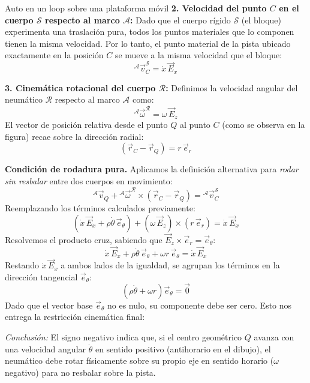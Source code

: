 \begin{solucion}{Auto en un loop sobre una plataforma móvil}
\textbf{2. Velocidad del punto $C$ en el cuerpo $\mathcal{S}$ respecto al marco $\mathcal{A}$:}
Dado que el cuerpo rígido $\mathcal{S}$ (el bloque) experimenta una traslación pura, todos los puntos materiales que lo componen tienen la misma velocidad. Por lo tanto, el punto material de la pista ubicado exactamente en la posición $C$ se mueve a la misma velocidad que el bloque:
\begin{equation*}
    {}^{\mathcal{A}}\vec{v}_C^{\mathcal{S}} = \dot{x}\,\vec{E}_x
\end{equation*}

\textbf{3. Cinemática rotacional del cuerpo $\mathcal{R}$:}
Definimos la velocidad angular del neumático $\mathcal{R}$ respecto al marco $\mathcal{A}$ como:
\begin{equation*}
    {}^{\mathcal{A}}\vec{\omega}^{\mathcal{R}} = \omega\,\vec{E}_z
\end{equation*}
El vector de posición relativa desde el punto $Q$ al punto $C$ (como se observa en la figura) recae sobre la dirección radial:
\begin{equation*}
    (\vec{r}_C - \vec{r}_Q) = r\,\vec{e}_r
\end{equation*}

\textbf{Condición de rodadura pura.}
Aplicamos la definición alternativa para \emph{rodar sin resbalar} entre dos cuerpos en movimiento:
\begin{equation*}
    {}^{\mathcal{A}}\vec{v}_Q + {}^{\mathcal{A}}\vec{\omega}^{\mathcal{R}} \times (\vec{r}_C - \vec{r}_Q) = {}^{\mathcal{A}}\vec{v}_C^{\mathcal{S}}
\end{equation*}
Reemplazando los términos calculados previamente:
\begin{equation*}
    (\dot{x}\,\vec{E}_x + \rho\dot{\theta}\,\vec{e}_\theta) + (\omega\,\vec{E}_z) \times (r\,\vec{e}_r) = \dot{x}\,\vec{E}_x
\end{equation*}
Resolvemos el producto cruz, sabiendo que $\vec{E}_z \times \vec{e}_r = \vec{e}_\theta$:
\begin{equation*}
    \dot{x}\,\vec{E}_x + \rho\dot{\theta}\,\vec{e}_\theta + \omega r\,\vec{e}_\theta = \dot{x}\,\vec{E}_x
\end{equation*}
Restando $\dot{x}\,\vec{E}_x$ a ambos lados de la igualdad, se agrupan los términos en la dirección tangencial $\vec{e}_\theta$:
\begin{equation*}
    (\rho\dot{\theta} + \omega r)\vec{e}_\theta = \vec{0}
\end{equation*}
Dado que el vector base $\vec{e}_\theta$ no es nulo, su componente debe ser cero. Esto nos entrega la restricción cinemática final:

\textit{Conclusión:} El signo negativo indica que, si el centro geométrico $Q$ avanza con una velocidad angular $\dot{\theta}$ en sentido positivo (antihorario en el dibujo), el neumático debe rotar físicamente sobre su propio eje en sentido horario ($\omega$ negativo) para no resbalar sobre la pista.
\end{solucion}
